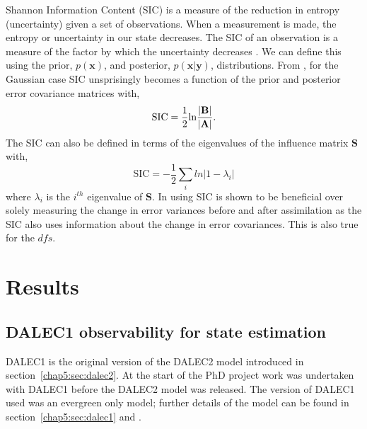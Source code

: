 Shannon Information Content (SIC) is a measure of the reduction in entropy (uncertainty) given a set of observations. When a measurement is made, the entropy or uncertainty in our state decreases. The SIC of an observation is a measure of the factor by which the uncertainty decreases \citep{cover1991elements}. We can define this using the prior, $p(\textbf{x})$, and posterior, $p(\textbf{x}|\textbf{y})$, distributions. From \citet{rodgers2000inverse}, for the Gaussian case SIC unsprisingly becomes a function of the prior and posterior error covariance matrices with,
\begin{equation}
\text{SIC}=\frac{1}{2}\text{ln}\frac{| \bf{B} |}{| \bf{A} |}. \label{chap5:eqn:sic}
\end{equation}
The SIC can also be defined in terms of the eigenvalues of the influence matrix $\textbf{S}$ with,
\begin{equation}
\text{SIC} = -\frac{1}{2} \sum_{i} ln | 1 - \lambda_{i} |
\end{equation}
where $\lambda_{i}$ is the $i^{th}$ eigenvalue of $\textbf{S}$. In \citet{eyre1990information} using SIC is shown to be beneficial over solely measuring the change in error variances before and after assimilation as the SIC also uses information about the change in error covariances. This is also true for the $dfs$.   

\section{Results}

\subsection{DALEC1 observability for state estimation} \label{chap5:sec:D1observability}

DALEC1 is the original version of the DALEC2 model introduced in section~\ref{chap5:sec:dalec2}. At the start of the PhD project work was undertaken with DALEC1 before the DALEC2 model was released. The version of DALEC1 used was an evergreen only model; further details of the model can be found in section~\ref{chap5:sec:dalec1} and \citet{williams2005improved}. 

